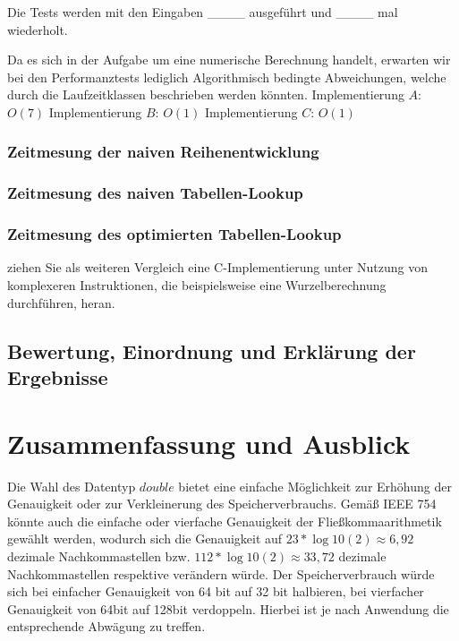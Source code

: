 \documentclass[course=erap] {aspdoc}
\begin{document}
    Die Tests werden mit den Eingaben ____ ausgeführt und ____ mal wiederholt.

    Da es sich in der Aufgabe um eine numerische Berechnung handelt, erwarten wir bei den Performanztests lediglich Algorithmisch bedingte Abweichungen, welche durch die Laufzeitklassen beschrieben werden könnten.
    Implementierung $A$: $O(7)$
    Implementierung $B$: $O(1)$
    Implementierung $C$: $O(1)$

    \subsubsection{Zeitmesung der naiven Reihenentwicklung}

    \subsubsection{Zeitmesung des naiven Tabellen-Lookup}

    \subsubsection{Zeitmesung des optimierten Tabellen-Lookup}
    ziehen Sie als weiteren Vergleich eine C-Implementierung unter Nutzung von komplexeren Instruktionen, die beispielsweise eine Wurzelberechnung durchführen, heran.

    \subsection{Bewertung, Einordnung und Erklärung der Ergebnisse}


    \section{Zusammenfassung und Ausblick}



    Die Wahl des Datentyp $double$ bietet eine einfache Möglichkeit zur Erhöhung der Genauigkeit oder zur Verkleinerung des Speicherverbrauchs.
    Gemäß IEEE 754 ~\cite{StandardforBinaryFloating} könnte auch die einfache oder vierfache Genauigkeit der
    Fließkommaarithmetik gewählt werden, wodurch sich die Genauigkeit auf $23*\log10(2) \approx 6,92$ dezimale Nachkommastellen
    bzw. $112*\log10(2) \approx 33,72$ dezimale Nachkommastellen respektive verändern würde.
    Der Speicherverbrauch würde sich bei einfacher Genauigkeit von 64 bit auf 32 bit halbieren, bei vierfacher Genauigkeit von 64bit auf 128bit verdoppeln.
    Hierbei ist je nach Anwendung die entsprechende Abwägung zu treffen.


    
    
\end{document}
